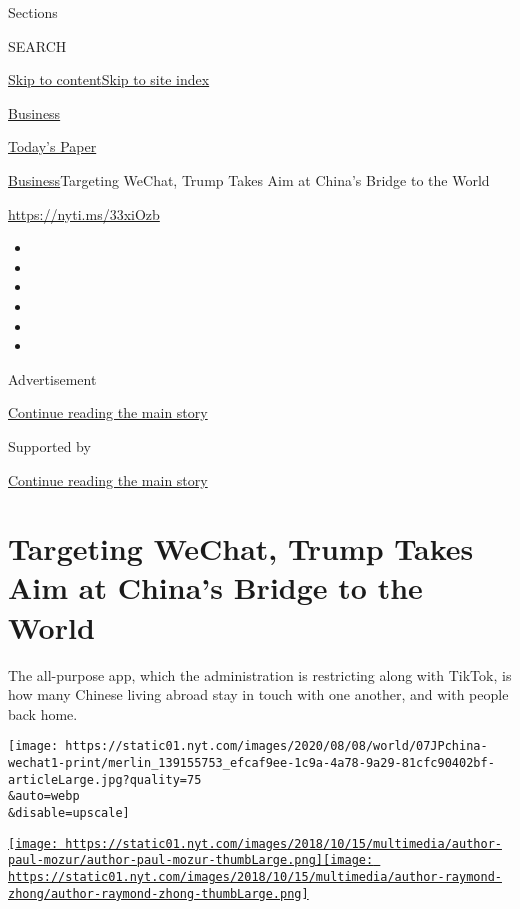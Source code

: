 Sections

SEARCH

\protect\hyperlink{site-content}{Skip to
content}\protect\hyperlink{site-index}{Skip to site index}

\href{https://www.nytimes.com/section/business}{Business}

\href{https://myaccount.nytimes.com/auth/login?response_type=cookie\&client_id=vi}{}

\href{https://www.nytimes.com/section/todayspaper}{Today's Paper}

\href{/section/business}{Business}\textbar{}Targeting WeChat, Trump
Takes Aim at China's Bridge to the World

\href{https://nyti.ms/33xiOzb}{https://nyti.ms/33xiOzb}

\begin{itemize}
\item
\item
\item
\item
\item
\item
\end{itemize}

Advertisement

\protect\hyperlink{after-top}{Continue reading the main story}

Supported by

\protect\hyperlink{after-sponsor}{Continue reading the main story}

\hypertarget{targeting-wechat-trump-takes-aim-at-chinas-bridge-to-the-world}{%
\section{Targeting WeChat, Trump Takes Aim at China's Bridge to the
World}\label{targeting-wechat-trump-takes-aim-at-chinas-bridge-to-the-world}}

The all-purpose app, which the administration is restricting along with
TikTok, is how many Chinese living abroad stay in touch with one
another, and with people back home.

\texttt{[image: https://static01.nyt.com/images/2020/08/08/world/07JPchina-wechat1-print/merlin\_139155753\_efcaf9ee-1c9a-4a78-9a29-81cfc90402bf-articleLarge.jpg?quality=75\\\&auto=webp\\\&disable=upscale]}

\href{https://www.nytimes.com/by/paul-mozur}{\texttt{[image: https://static01.nyt.com/images/2018/10/15/multimedia/author-paul-mozur/author-paul-mozur-thumbLarge.png]}}\href{https://www.nytimes.com/by/raymond-zhong}{\texttt{[image: https://static01.nyt.com/images/2018/10/15/multimedia/author-raymond-zhong/author-raymond-zhong-thumbLarge.png]}}

